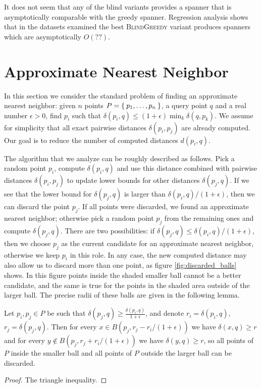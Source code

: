 \documentclass[a4paper,USenglish]{socg-lipics-v2018}
\newcommand{\eps}{\epsilon}
\newcommand{\dist}{\delta}
\begin{document}
It does not seem that any of the blind variants provides a spanner that is asymptotically comparable
with the greedy spanner. Regression analysis shows that in the datasets examined the best \textsc{BlindGreedy}
variant produces spanners which are asymptotically $O(??)$.

\section{Approximate Nearest Neighbor}

In this section we consider the standard problem of finding an approximate nearest neighbor: given
$n$ points $P = \Set{p_1, \dots, p_n}$, a query point $q$ and a real number $\eps > 0$,
find $p_i$ such that $\dist(p_i, q) \leq (1 + \eps) \min_{k} \dist(q, p_k)$. We assume for simplicity
that all exact pairwise distances $\dist(p_i, p_j)$ are already computed. Our goal is to reduce the number
of computed distances $d(p_i, q)$.


The algorithm that we analyze can be roughly described as follows. Pick a random point $p_i$,
compute $\dist(p_i, q)$ and use this distance combined with pairwise distances $\dist(p_i, p_j)$
to update lower bounds for other distances $\dist(p_j, q)$.
If we see that the lower bound for $\dist(p_j, q)$ is larger than $\dist(p_i, q) / (1+\eps)$, then 
we can discard the point $p_j$. If all points were discarded, we found an approximate nearest neighbor;
otherwise pick a random point $p_j$ from the remaining ones and compute $\dist(p_j, q)$.
There are two possibilities: if $\dist(p_j, q) \leq \dist(p_i, q) / (1+\eps)$,
then we choose $p_j$ as the current candidate for an approximate nearest neighbor,
otherwise we keep $p_i$ in this role. In any case, the new computed distance
may also allow us to discard more than one point, as figure \ref{fig:discarded_balls} shows. In
this figure points inside the shaded smaller ball cannot be a better candidate,
and the same is true for the points in the shaded area outside of the larger ball.
The precise radii of these balls are given in the following lemma.

\begin{lemma}
    Let $p_i, p_j \in P$ be such that $\dist(p_j, q) \geq \frac{\dist(p_i, q)}{1 + \eps}$,
    and denote $r_i = \dist(p_i, q)$, $r_j = \dist(p_j, q)$.
    Then for every $x \in B(p_j, r_j - r_i / (1+\eps))$ we have $\dist(x, q) \geq r$
    and for every $y \notin B(p_j, r_j + r_i / (1+ \eps))$ we have $\dist(y, q) \geq r$,
    so all points of $P$ inside the smaller ball and all points of $P$ outside the larger ball
    can be discarded.
\end{lemma}
\begin{proof}
    The triangle inequality.
\end{proof}
\end{document}
